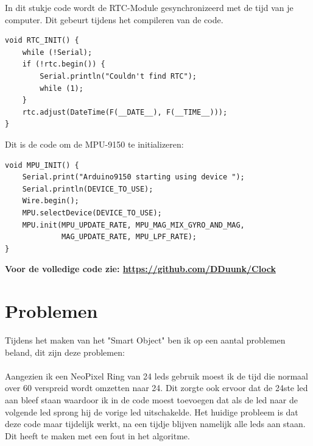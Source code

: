 \documentclass[a4paper,12pt]{article}
\begin{document}
In dit stukje code wordt de RTC-Module gesynchronizeerd met de tijd van je computer. 
Dit gebeurt tijdens het compileren van de code.
\begin{lstlisting}[caption=RTC.cpp]
void RTC_INIT() {
    while (!Serial);
    if (!rtc.begin()) {
        Serial.println("Couldn't find RTC");
        while (1);
    }
    rtc.adjust(DateTime(F(__DATE__), F(__TIME__)));
}
\end{lstlisting}
Dit is de code om de MPU-9150 te initializeren:
\begin{lstlisting}[caption=MPU.cpp]
void MPU_INIT() {
    Serial.print("Arduino9150 starting using device "); 
    Serial.println(DEVICE_TO_USE);
    Wire.begin();
    MPU.selectDevice(DEVICE_TO_USE);
    MPU.init(MPU_UPDATE_RATE, MPU_MAG_MIX_GYRO_AND_MAG, 
             MAG_UPDATE_RATE, MPU_LPF_RATE); 
}
\end{lstlisting}
\textbf{Voor de volledige code zie: \url{https://github.com/DDuunk/Clock} }

\section{Problemen}
Tijdens het maken van het "Smart Object" ben ik op een aantal problemen beland, dit zijn deze problemen: 
\\ \\
Aangezien ik een NeoPixel Ring van 24 leds gebruik moest ik de tijd die normaal over 60 verspreid wordt omzetten naar 24.
Dit zorgte ook ervoor dat de 24ste led aan bleef staan waardoor ik in de code moest toevoegen dat als de led naar de volgende led sprong hij de vorige led uitschakelde.
Het huidige probleem is dat deze code maar tijdelijk werkt, na een tijdje blijven namelijk alle leds aan staan. Dit heeft te maken met een fout in het algoritme.
\end{document}
